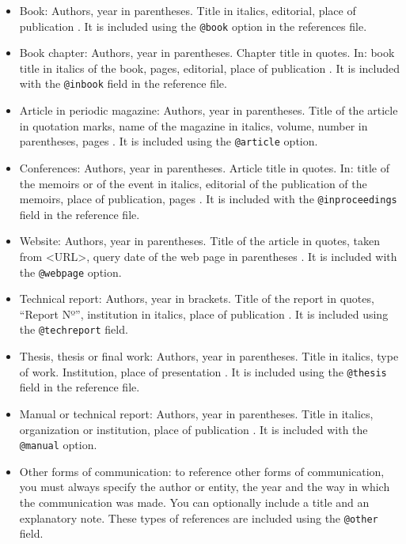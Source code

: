 \begin{itemize}
 \item Book: Authors, year in parentheses. Title in italics, editorial, place of publication \cite{Alarcos1999}. It is included using the \texttt{@book} option in the references file.
%
 \item Book chapter: Authors, year in parentheses. Chapter title in quotes. In: book title in italics of the book, pages, editorial, place of publication \cite{Mitchell2001}. It is included with the \texttt{@inbook} field in the reference file.
%
 \item Article in periodic magazine: Authors, year in parentheses. Title of the article in quotation marks, name of the magazine in italics, volume, number in parentheses, pages \cite{ArslanHansen1996, WangEtAl2015}. It is included using the \texttt{@article} option.
%
 \item Conferences: Authors, year in parentheses. Article title in quotes. In: title of the memoirs or of the event in italics, editorial of the publication of the memoirs, place of publication, pages \cite{BarkovaJouvet1999}. It is included with the \texttt{@inproceedings} field in the reference file.
%
 \item Website: Authors, year in parentheses. Title of the article in quotes, taken from <URL>, query date of the web page in parentheses \cite{CFDwebpage}. It is included with the \texttt{@webpage} option.
%
 \item Technical report: Authors, year in brackets. Title of the report in quotes, ``Report Nº'', institution in italics, place of publication \cite{NACA460}. It is included using the \texttt{@techreport} field.
%
 \item Thesis, thesis or final work: Authors, year in parentheses. Title in italics, type of work. Institution, place of presentation \cite{Krause2014}. It is included using the \texttt{@thesis} field in the reference file.
%
 \item Manual or technical report: Authors, year in parentheses. Title in italics, organization or institution, place of publication \cite{Indura2010}. It is included with the \texttt{@manual} option.
%
 \item Other forms of communication: to reference other forms of communication, you must always specify the author or entity, the year and the way in which the communication was made. You can optionally include a title and an explanatory note. These types of references are included using the \texttt{@other} field.
\end{itemize}

